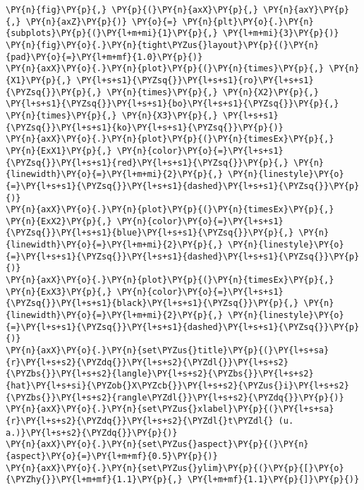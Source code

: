    \begin{tcolorbox}[breakable, size=fbox, boxrule=1pt, pad at break*=1mm,colback=cellbackground, colframe=cellborder]
\begin{Verbatim}[commandchars=\\\{\}]
\PY{n}{fig}\PY{p}{,} \PY{p}{(}\PY{n}{axX}\PY{p}{,} \PY{n}{axY}\PY{p}{,} \PY{n}{axZ}\PY{p}{)} \PY{o}{=} \PY{n}{plt}\PY{o}{.}\PY{n}{subplots}\PY{p}{(}\PY{l+m+mi}{1}\PY{p}{,} \PY{l+m+mi}{3}\PY{p}{)}
\PY{n}{fig}\PY{o}{.}\PY{n}{tight\PYZus{}layout}\PY{p}{(}\PY{n}{pad}\PY{o}{=}\PY{l+m+mf}{1.0}\PY{p}{)}
\PY{n}{axX}\PY{o}{.}\PY{n}{plot}\PY{p}{(}\PY{n}{times}\PY{p}{,} \PY{n}{X1}\PY{p}{,} \PY{l+s+s1}{\PYZsq{}}\PY{l+s+s1}{ro}\PY{l+s+s1}{\PYZsq{}}\PY{p}{,} \PY{n}{times}\PY{p}{,} \PY{n}{X2}\PY{p}{,} \PY{l+s+s1}{\PYZsq{}}\PY{l+s+s1}{bo}\PY{l+s+s1}{\PYZsq{}}\PY{p}{,} \PY{n}{times}\PY{p}{,} \PY{n}{X3}\PY{p}{,} \PY{l+s+s1}{\PYZsq{}}\PY{l+s+s1}{ko}\PY{l+s+s1}{\PYZsq{}}\PY{p}{)}
\PY{n}{axX}\PY{o}{.}\PY{n}{plot}\PY{p}{(}\PY{n}{timesEx}\PY{p}{,} \PY{n}{ExX1}\PY{p}{,} \PY{n}{color}\PY{o}{=}\PY{l+s+s1}{\PYZsq{}}\PY{l+s+s1}{red}\PY{l+s+s1}{\PYZsq{}}\PY{p}{,} \PY{n}{linewidth}\PY{o}{=}\PY{l+m+mi}{2}\PY{p}{,} \PY{n}{linestyle}\PY{o}{=}\PY{l+s+s1}{\PYZsq{}}\PY{l+s+s1}{dashed}\PY{l+s+s1}{\PYZsq{}}\PY{p}{)}
\PY{n}{axX}\PY{o}{.}\PY{n}{plot}\PY{p}{(}\PY{n}{timesEx}\PY{p}{,} \PY{n}{ExX2}\PY{p}{,} \PY{n}{color}\PY{o}{=}\PY{l+s+s1}{\PYZsq{}}\PY{l+s+s1}{blue}\PY{l+s+s1}{\PYZsq{}}\PY{p}{,} \PY{n}{linewidth}\PY{o}{=}\PY{l+m+mi}{2}\PY{p}{,} \PY{n}{linestyle}\PY{o}{=}\PY{l+s+s1}{\PYZsq{}}\PY{l+s+s1}{dashed}\PY{l+s+s1}{\PYZsq{}}\PY{p}{)}
\PY{n}{axX}\PY{o}{.}\PY{n}{plot}\PY{p}{(}\PY{n}{timesEx}\PY{p}{,} \PY{n}{ExX3}\PY{p}{,} \PY{n}{color}\PY{o}{=}\PY{l+s+s1}{\PYZsq{}}\PY{l+s+s1}{black}\PY{l+s+s1}{\PYZsq{}}\PY{p}{,} \PY{n}{linewidth}\PY{o}{=}\PY{l+m+mi}{2}\PY{p}{,} \PY{n}{linestyle}\PY{o}{=}\PY{l+s+s1}{\PYZsq{}}\PY{l+s+s1}{dashed}\PY{l+s+s1}{\PYZsq{}}\PY{p}{)}
\PY{n}{axX}\PY{o}{.}\PY{n}{set\PYZus{}title}\PY{p}{(}\PY{l+s+sa}{r}\PY{l+s+s2}{\PYZdq{}}\PY{l+s+s2}{\PYZdl{}}\PY{l+s+s2}{\PYZbs{}}\PY{l+s+s2}{langle}\PY{l+s+s2}{\PYZbs{}}\PY{l+s+s2}{hat}\PY{l+s+si}{\PYZob{}X\PYZcb{}}\PY{l+s+s2}{\PYZus{}i}\PY{l+s+s2}{\PYZbs{}}\PY{l+s+s2}{rangle\PYZdl{}}\PY{l+s+s2}{\PYZdq{}}\PY{p}{)}
\PY{n}{axX}\PY{o}{.}\PY{n}{set\PYZus{}xlabel}\PY{p}{(}\PY{l+s+sa}{r}\PY{l+s+s2}{\PYZdq{}}\PY{l+s+s2}{\PYZdl{}t\PYZdl{} (u. a.)}\PY{l+s+s2}{\PYZdq{}}\PY{p}{)}
\PY{n}{axX}\PY{o}{.}\PY{n}{set\PYZus{}aspect}\PY{p}{(}\PY{n}{aspect}\PY{o}{=}\PY{l+m+mf}{0.5}\PY{p}{)}
\PY{n}{axX}\PY{o}{.}\PY{n}{set\PYZus{}ylim}\PY{p}{(}\PY{p}{[}\PY{o}{\PYZhy{}}\PY{l+m+mf}{1.1}\PY{p}{,} \PY{l+m+mf}{1.1}\PY{p}{]}\PY{p}{)}

\end{Verbatim}
\end{tcolorbox}

